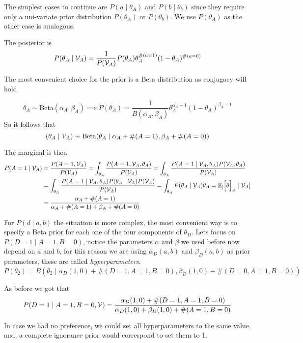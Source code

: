 The simplest cases to continue are \(P(a\mid \theta_{A})\) and
\(P(b \mid \theta_{b})\) since they require only a uni-variate prior distribution
\(P(\theta_{A})\) or \(P(\theta_{b})\). We use \(P(\theta_{A})\) as the other
case is analogous.

The posterior is
\[
  P(\theta_{A} \mid \mathcal{V}_{A}) = \frac{1}{P(\mathcal{V}_{A})}P(\theta_{A})\theta_{A}^{\#(a=1)}(1-\theta_{A})^{\#(a=0)}
\]

The most convenient choice for the prior is a Beta distribution as conjugacy
will hold.

\[
  \theta_{A} \sim \text{Beta}(\alpha_{A}, \beta_{A}) \implies P(\theta_{A})  = \frac{1}{B(\alpha_{A}, \beta_{A})}\theta_{A}^{\alpha_{A}-1}(1-\theta_{A})^{\beta_{A} - 1}
\]
So it follows that
\[
  (\theta_{A} \mid \mathcal{V}_{A}) \sim \text{Beta}(\theta_{A} \mid \alpha_{A} + \#(A=1), \beta_{A} + \#(A = 0))
\]

The marginal is then
\[
  \begin{aligned}
    P(A = 1 \mid \mathcal{V}_{A})
    &= \frac{P(A = 1, \mathcal{V}_{A})}{P(\mathcal{V}_{A})} = \int_{\theta_{A}}  \frac{P(A = 1, \mathcal{V}_{A}, \theta_{A})}{P(\mathcal{V}_{A})} =  \int_{\theta_{A}}  \frac{P(A = 1 \mid \mathcal{V}_{A}, \theta_{A}) P(\mathcal{V}_{A}, \theta_{A})}{P(\mathcal{V}_{A})} \\
    &=  \int_{\theta_{A}}  \frac{P(A = 1 \mid \mathcal{V}_{A}, \theta_{A}) P(\theta_{A} \mid \mathcal{V}_{A})P(\mathcal{V}_{A})}{P(\mathcal{V}_{A})} = \int_{\theta_{A}}P(\theta_{A}\mid \mathcal{V}_{A})\theta_{A} = \mathbb{E}_{[}\Big[\theta\Big]_{A} \mid \mathcal{V}_{A}] \\
    &= \frac{\alpha_{A} + \#(A= 1)}{\alpha_{A} + \#(A=1) + \beta_{A} + \#(A=0)}
  \end{aligned}
\]

For \(P(d \mid a ,b)\) the situation is more complex, the most convenient way is
to specify a Beta prior for each one of the four components of \(\theta_{D}\).
Lets focus on \(P(D = 1 \mid A = 1, B = 0)\), notice the parameters \(\alpha\)
and \(\beta\) we used before now depend on \(a\) and \(b\), for this reason we
are using \(\alpha_{D}(a,b)\) and \(\beta_{D}(a,b)\) as prior parameters, these
are called \emph{hyperparameters}.
\[
  P(\theta_{2}) = B(\theta_{2} \mid \alpha_{D}(1,0) + \#(D = 1, A = 1, B = 0), \beta_{D}(1,0) + \#(D = 0, A = 1, B = 0))
\]

As before we got that
\[
  P(D = 1 \mid A = 1, B = 0, \mathcal{V}) = \frac{\alpha_{D}(1,0) + \#(D = 1, A = 1, B = 0)}{\alpha_{D}(1,0) + \beta_{D}(1,0) + \#(A=1, B = 0)}
\]

In case we had no preference, we could set all hyperparameters to the same
value, and, a complete ignorance prior would correspond to set them to 1.

